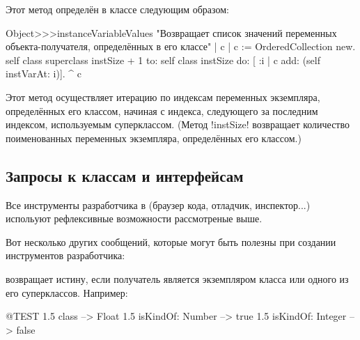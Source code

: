 \documentclass[a4paper,10pt,twoside]{book}
\begin{document}
Этот метод определён в классе  следующим образом:
\begin{code}{}
Object>>>instanceVariableValues
	"Возвращает список значений переменных объекта-получателя, определённых в его классе"
	| c |
	c := OrderedCollection new.
	self class superclass instSize + 1
		to: self class instSize
		do: [ :i | c add: (self instVarAt: i)].
	^ c
\end{code}

Этот метод осуществляет итерацию по индексам переменных экземпляра, определённых его классом, начиная с индекса, следующего за последним индексом, используемым суперклассом.
(Метод \ct!instSize! возвращает количество поименованных переменных экземпляра, определённых его классом.)

\subsection{Запросы к классам и интерфейсам}

Все инструменты разработчика в \pharo (браузер кода, отладчик, инспектор...) испольуют рефлексивные возможности рассмотреные выше.

Вот несколько других сообщений, которые могут быть полезны при создании инструментов разработчика:

 возвращает истину, если получатель является экземпляром класса  или одного из его суперклассов.
Например:
\begin{code}{@TEST}
1.5 class                     --> Float
1.5 isKindOf: Number --> true
1.5 isKindOf: Integer   --> false
\end{code}
\end{document}
